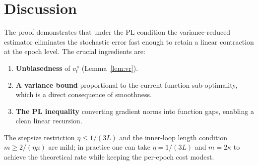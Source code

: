 \documentclass{article}
\begin{document}
\section*{Discussion}
The proof demonstrates that under the PL condition the variance‑reduced estimator eliminates the stochastic error fast enough to retain a linear contraction at the epoch level. The crucial ingredients are:
\begin{enumerate}
\item \textbf{Unbiasedness} of $v_t^{\,s}$ (Lemma~\ref{lem:vr}).
\item \textbf{A variance bound} proportional to the current function sub‑optimality, which is a direct consequence of smoothness.
\item \textbf{The PL inequality} converting gradient norms into function gaps, enabling a clean linear recursion.
\end{enumerate}
The stepsize restriction $\eta\le 1/(3L)$ and the inner‑loop length condition $m\ge 2/(\eta\mu)$ are mild; in practice one can take $\eta=1/(3L)$ and $m=2\kappa$ to achieve the theoretical rate while keeping the per‑epoch cost modest.

\end{document}
